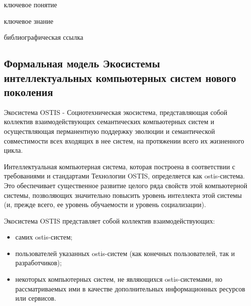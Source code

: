 \begin{SCn}

\bigskip

\begin{scnrelfromlist}{ключевое понятие}
\end{scnrelfromlist}

\bigskip

\begin{scnrelfromlist}{ключевое знание}
\end{scnrelfromlist}

\bigskip

\begin{scnrelfromlist}{библиографическая ссылка}
\end{scnrelfromlist}

\end{SCn}


\subsection{Формальная модель Экосистемы интеллектуальных компьютерных систем нового поколения}
{\label{sec_ecosystem_formal_model}} 

Экосистема OSTIS - Социотехническая экосистема, представляющая собой коллектив взаимодействующих семантических компьютерных систем и осуществляющая перманентную поддержку эволюции и семантической совместимости всех входящих в нее систем, на протяжении всего их жизненного цикла. 

Интеллектуальная компьютерная система, которая построена в соответствии с требованиями и стандартами Технологии OSTIS, определяется как ostis-система. 
Это обеспечивает существенное развитие целого ряда свойств этой компьютерной системы, позволяющих значительно повысить уровень интеллекта этой системы (и, прежде всего, ее уровень обучаемости и уровень социализации). 

Экосистема OSTIS представляет собой коллектив взаимодействующих:
\begin{itemize}
    \item{самих ostis-систем;}
    \item{пользователей указанных ostis-систем (как конечных пользователей, так и разработчиков);}
    \item{некоторых компьютерных систем, не являющихся ostis-системами, но рассматриваемых ими в качестве дополнительных информационных ресурсов или сервисов.}
\end{itemize}

